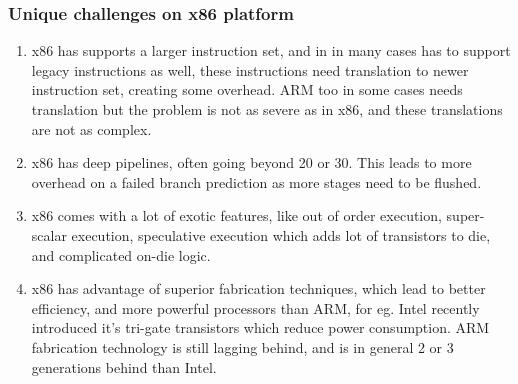 \documentclass[a4paper,10pt]{article}
\begin{document}
\subsubsection{Unique challenges on x86 platform}

\begin{enumerate}
\item x86 has supports a larger instruction set, and in in many cases has to support legacy instructions as well, these instructions need translation to newer instruction set, creating some overhead. ARM too in some cases needs translation but the problem is not as severe as in x86, and these translations are not as complex.

\item x86 has deep pipelines, often going beyond 20 or 30. This leads to more overhead on a failed branch prediction as more stages need to be flushed.

\item x86 comes with a lot of exotic features, like out of order execution, super-scalar execution, speculative execution which adds lot of transistors to die, and complicated on-die logic.

\item x86 has advantage of superior fabrication techniques, which lead to better efficiency, and more powerful processors than ARM, for eg. Intel recently introduced it's tri-gate transistors which reduce power consumption. ARM fabrication technology is still lagging behind, and is in general 2 or 3 generations behind than Intel.
\end{enumerate}


\end{document}
